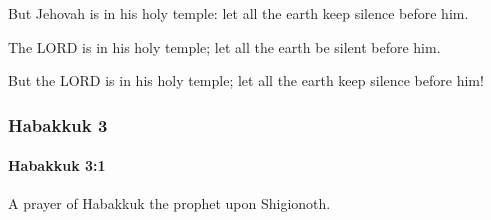 			\begin{versebox}
					\item[BHS] 
					\item[LXX] 
					\item[ASV] But Jehovah is in his holy temple: let all the earth keep silence before him.
					\item[NIV] The LORD is in his holy temple; let all the earth be silent before him.
					\item[NRSV] But the LORD is in his holy temple; let all the earth keep silence before him!
			\end{versebox}
	\subsubsection{Habakkuk 3} %
		\label{HABAKKUK-3}

		\paragraph{Habakkuk 3:1} %
			\label{HABAKKUK-3-1}

			A prayer of Habakkuk the prophet upon Shigionoth.

